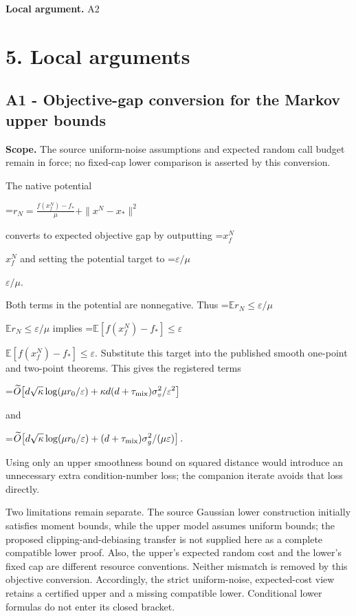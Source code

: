 \documentclass[10pt,a4paper]{article}
\newcommand{\AtlasMath}[1]{\par\begingroup\centering\setbox0=\hbox{$\displaystyle #1$}\ifdim\wd0>1.4\linewidth\typeout{ATLAS WIDE FORMULA: \the\wd0}\fi\ifdim\wd0>\linewidth\resizebox{\linewidth}{!}{\box0}\else\box0\fi\par\endgroup}
\newcommand{\AtlasInlineMath}[1]{\begingroup\setbox0=\hbox{$#1$}\ifdim\wd0>.4\linewidth\endgroup\AtlasMath{#1}\else\endgroup$#1$\fi}
\begin{document}
\textbf{Local argument.} A2

\section{5. Local arguments}
\subsection{A1 - Objective-gap conversion for the Markov upper bounds}
\textbf{Scope.} The source uniform-noise assumptions and expected random call budget remain in force; no fixed-cap lower comparison is asserted by this conversion.

The native potential

\AtlasMath{r_N=\frac{f(x_f^N)-f_*}{\mu}+\|x^N-x_*\|^2}

converts to expected objective gap by outputting \AtlasInlineMath{x_f^N} and setting the potential target to \AtlasInlineMath{\varepsilon/\mu}.

Both terms in the potential are nonnegative. Thus \AtlasInlineMath{\mathbb E r_N\le\varepsilon/\mu} implies \AtlasInlineMath{\mathbb E[f(x_f^N)-f_*]\le\varepsilon}. Substitute this target into the published smooth one-point and two-point theorems. This gives the registered terms

\AtlasMath{\widetilde O\!\left[d\sqrt\kappa\log(\mu r_0/\varepsilon)+\kappa d(d+\tau_{\rm mix})\sigma_v^2/\varepsilon^2\right]}

and

\AtlasMath{\widetilde O\!\left[d\sqrt\kappa\log(\mu r_0/\varepsilon)+(d+\tau_{\rm mix})\sigma_g^2/(\mu\varepsilon)\right].}

Using only an upper smoothness bound on squared distance would introduce an unnecessary extra condition-number loss; the companion iterate avoids that loss directly.

Two limitations remain separate. The source Gaussian lower construction initially satisfies moment bounds, while the upper model assumes uniform bounds; the proposed clipping-and-debiasing transfer is not supplied here as a complete compatible lower proof. Also, the upper's expected random cost and the lower's fixed cap are different resource conventions. Neither mismatch is removed by this objective conversion. Accordingly, the strict uniform-noise, expected-cost view retains a certified upper and a missing compatible lower. Conditional lower formulas do not enter its closed bracket.
\end{document}
